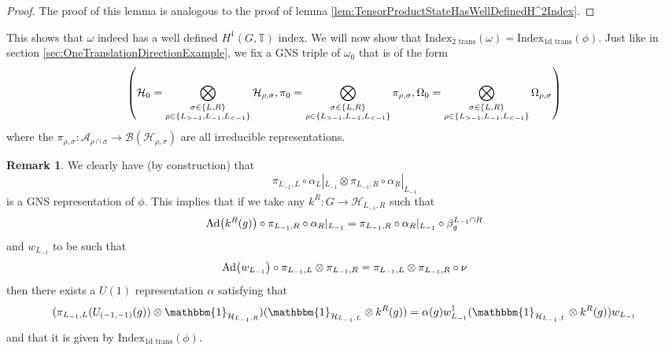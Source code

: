 \documentclass[12pt,a4paper,twoside]{article}
\let\originalleft\left
\let\originalright\right
\renewcommand{\left}{\mathopen{}\mathclose\bgroup\originalleft}
\renewcommand{\right}{\aftergroup\egroup\originalright}
\newcommand{\BB}{\mathcal B}
\newcommand{\HH}{\mathcal H}
\newcommand{\TT}{\mathbb T}
\renewcommand{\AA}{\mathcal A}
\newcommand{\id}{\mathbbm{1}}
\newcommand{\Ad}[1]{\textrm{Ad}\left(#1\right)}
\theoremstyle{definition}
\newtheorem{remark}[theorem]{Remark}
\numberwithin{equation}{section}
\begin{document}
\begin{proof}
	The proof of this lemma is analogous to the proof of lemma \ref{lem:TensorProductStateHasWellDefinedH^2Index}.
\end{proof}
This shows that $\omega$ indeed has a well defined $H^1(G,\TT)$ index. We will now show that $\textrm{Index}_{\text{2 trans}}(\omega)=\textrm{Index}_{\text{1d trans}}(\phi)$. Just like in section \ref{sec:OneTranslationDirectionExample}, we fix a GNS triple of $\omega_0$ that is of the form
\begin{equation}
	\left(\HH_0=\bigotimes_{\substack{\sigma\in\{L,R\}\\ \rho\in\{L_{>-1},L_{-1},L_{<-1}\}}}\HH_{\rho,\sigma},\pi_0=\bigotimes_{\substack{\sigma\in\{L,R\}\\ \rho\in\{L_{>-1},L_{-1},L_{<-1}\}}}\pi_{\rho,\sigma},\Omega_0=\bigotimes_{\substack{\sigma\in\{L,R\}\\ \rho\in\{L_{>-1},L_{-1},L_{<-1}\}}}\Omega_{\rho,\sigma}\right)
\end{equation}
where the $\pi_{\rho,\sigma}:\AA_{\rho\cap\sigma}\rightarrow\BB(\HH_{\rho,\sigma})$ are all irreducible representations.
\begin{remark}\label{rem:GNS_One_DimensionalTwoTranslations}
	We clearly have (by construction) that
	\begin{equation}
		\pi_{L_{-1},L}\circ\alpha_L|_{L_{-1}}\otimes \pi_{L_{-1},R}\circ\alpha_R|_{L_{-1}}
	\end{equation}
	is a GNS representation of $\phi$. This implies that if we take any $k^R:G\rightarrow \HH_{L_{-1},R}$ such that
	\begin{equation}
		\Ad{k^R(g)}\circ\pi_{L_{-1},R}\circ\alpha_R|_{L_{-1}}=\pi_{L_{-1},R}\circ\alpha_R|_{L_{-1}}\circ\beta_{g}^{L_{-1}\cap R}
	\end{equation}
	and $w_{L_{-1}}$ to be such that
	\begin{equation}
		\Ad{w_{L_{-1}}}\circ\pi_{L_{-1},L}\otimes \pi_{L_{-1},R}=\pi_{L_{-1},L}\otimes \pi_{L_{-1},R}\circ\nu
	\end{equation}
	then there exists a $U(1)$ representation $\alpha$ satisfying that
	\begin{equation}
		(\pi_{L_{-1},L}(U_{(-1,-1)}(g))\otimes \id_{\HH_{L_{-1},R}}) (\id_{\HH_{L_{-1},L}}\otimes k^R(g))=\alpha(g) w_{L_{-1}}^\dagger(\id_{\HH_{L_{-1},L}}\otimes k^R(g))w_{L_{-1}}
	\end{equation}
	and that it is given by $\textrm{Index}_{\text{1d trans}}(\phi)$.
\end{remark}
\end{document}
